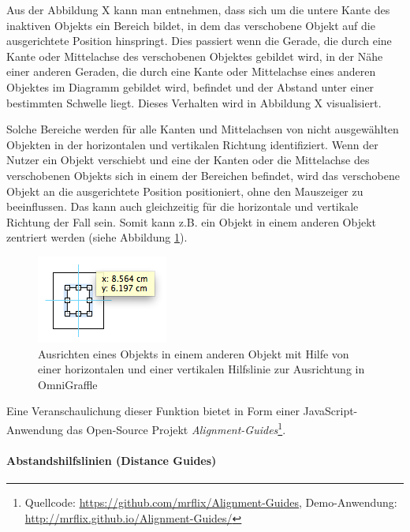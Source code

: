 
Aus der Abbildung X kann man entnehmen, dass sich um die untere Kante des inaktiven Objekts ein Bereich bildet, in dem das verschobene Objekt auf die ausgerichtete Position hinspringt. Dies passiert wenn die Gerade, die durch eine Kante oder Mittelachse des verschobenen Objektes gebildet wird, in der Nähe einer anderen Geraden, die durch eine Kante oder Mittelachse eines anderen Objektes im Diagramm gebildet wird, befindet und der Abstand unter einer bestimmten Schwelle liegt. Dieses Verhalten wird in Abbildung X visualisiert.


Solche Bereiche werden für alle Kanten und Mittelachsen von nicht ausgewählten Objekten in der horizontalen und vertikalen Richtung identifiziert. Wenn der Nutzer ein Objekt verschiebt und eine der Kanten oder die Mittelachse des verschobenen Objekts sich in einem der Bereichen befindet, wird das verschobene Objekt an die ausgerichtete Position positioniert, ohne den Mauszeiger zu beeinflussen. Das kann auch gleichzeitig für die horizontale und vertikale Richtung der Fall sein. Somit kann z.B. ein Objekt in einem anderen Objekt zentriert werden (siehe Abbildung \ref{fig:omnigraffle-alignment-guides-centering}).

\begin{figure}[hbt]
    \centering
    \includegraphics{resources/omnigraffle-alignment-guides-centering.png}
    \caption{Ausrichten eines Objekts in einem anderen Objekt mit Hilfe von einer horizontalen und einer vertikalen Hilfslinie zur Ausrichtung in OmniGraffle}
    \label{fig:omnigraffle-alignment-guides-centering}
\end{figure}

Eine Veranschaulichung dieser Funktion bietet in Form einer JavaScript-Anwendung das Open-Source Projekt \textit{Alignment-Guides}\footnote{Quellcode: \url{https://github.com/mrflix/Alignment-Guides}, Demo-Anwendung: \url{http://mrflix.github.io/Alignment-Guides/}}.

\paragraph{Abstandshilfslinien (Distance Guides)}

